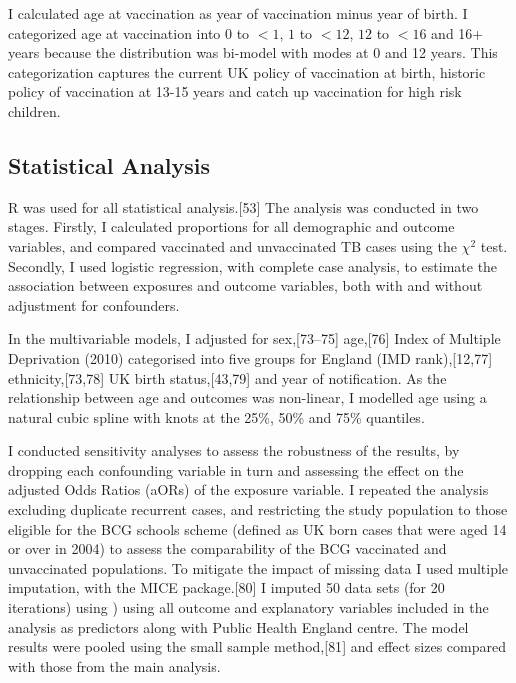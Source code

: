 \documentclass[11pt,twoside]{bristolthesis}
\begin{document}
  I calculated age at vaccination as year of vaccination minus year of birth. I categorized age at vaccination into \(0\) to \(< 1\), \(1\) to \(< 12\), \(12\) to \(< 16\) and 16+ years because the distribution was bi-model with modes at 0 and 12 years. This categorization captures the current UK policy of vaccination at birth, historic policy of vaccination at 13-15 years and catch up vaccination for high risk children.
  
  \hypertarget{statistical-analysis-1}{%
  \subsection{Statistical Analysis}\label{statistical-analysis-1}}
  
  R was used for all statistical analysis.{[}53{]} The analysis was conducted in two stages. Firstly, I calculated proportions for all demographic and outcome variables, and compared vaccinated and unvaccinated TB cases using the \(\chi ^2\) test. Secondly, I used logistic regression, with complete case analysis, to estimate the association between exposures and outcome variables, both with and without adjustment for confounders.
  
  In the multivariable models, I adjusted for sex,{[}73--75{]} age,{[}76{]} Index of Multiple Deprivation (2010) categorised into five groups for England (IMD rank),{[}12,77{]} ethnicity,{[}73,78{]} UK birth status,{[}43,79{]} and year of notification. As the relationship between age and outcomes was non-linear, I modelled age using a natural cubic spline with knots at the 25\%, 50\% and 75\% quantiles.
  
  I conducted sensitivity analyses to assess the robustness of the results, by dropping each confounding variable in turn and assessing the effect on the adjusted Odds Ratios (aORs) of the exposure variable. I repeated the analysis excluding duplicate recurrent cases, and restricting the study population to those eligible for the BCG schools scheme (defined as UK born cases that were aged 14 or over in 2004) to assess the comparability of the BCG vaccinated and unvaccinated populations. To mitigate the impact of missing data I used multiple imputation, with the MICE package.{[}80{]} I imputed 50 data sets (for 20 iterations) using ) using all outcome and explanatory variables included in the analysis as predictors along with Public Health England centre. The model results were pooled using the small sample method,{[}81{]} and effect sizes compared with those from the main analysis.
  
\end{document}
